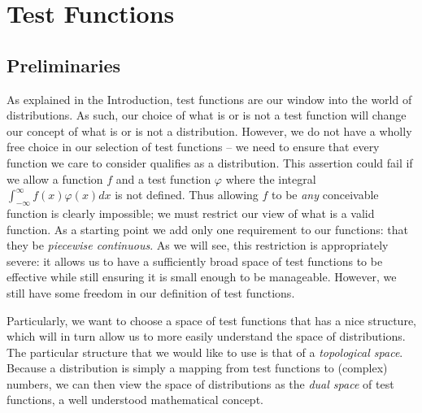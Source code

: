 \chapter{Test Functions}
  
  \section{Preliminaries}

    As explained in the Introduction, test functions are our window into the world of distributions.
    As such, our choice of what is or is not a test function will change our concept of what is or is not a distribution.
    However, we do not have a wholly free choice in our selection of test functions -- we need to ensure that every function we care to consider qualifies as a distribution.
    This assertion could fail if we allow a function $f$ and a test function $\varphi$ where the integral $\int_{-\infty}^{\infty} f(x)\varphi(x)dx$ is not defined.
    Thus allowing $f$ to be \emph{any} conceivable function is clearly impossible; we must restrict our view of what is a valid function. %
    As a starting point we add only one requirement to our functions: that they be \emph{piecewise continuous}. %
    As we will see, this restriction is appropriately severe: it allows us to have a sufficiently broad space of test functions to be effective while still ensuring it is small enough to be manageable.
    However, we still have some freedom in our definition of test functions.

    Particularly, we want to choose a space of test functions that has a nice structure, which will in turn allow us to more easily understand the space of distributions.
    The particular structure that we would like to use is that of a \emph{topological space}.
    Because a distribution is simply a mapping from test functions to (complex) numbers, we can then view the space of distributions as the \emph{dual space} of test functions, a well understood mathematical concept.

